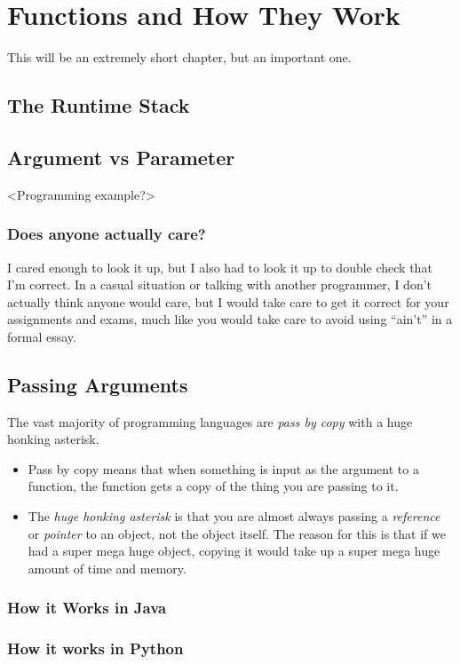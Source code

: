 \chapter{Functions and How They Work}

This will be an extremely short chapter, but an important one.

\section{The Runtime Stack}

\section{Argument vs Parameter}


<Programming example?>

\subsection{Does anyone actually care?}

I cared enough to look it up, but I also had to look it up to double check that I'm correct.  
In a casual situation or talking with another programmer, I don't actually think anyone would care, but I would take care to get it correct for your assignments and exams, much like you would take care to avoid using ``ain't'' in a formal essay.

\section{Passing Arguments}

The vast majority of programming languages are \textit{pass by copy} with a huge honking asterisk.
\begin{itemize}
	\item Pass by copy means that when something is input as the argument to a function, the function gets a copy of the thing you are passing to it.
	\item The \textit{huge honking asterisk} is that you are almost always passing a \textit{reference} or \textit{pointer} to an object, not the object itself.  The reason for this is that if we had a super mega huge object, copying it would take up a super mega huge amount of time and memory.
\end{itemize}



\subsection{How it Works in Java}


\subsection{How it works in Python}

